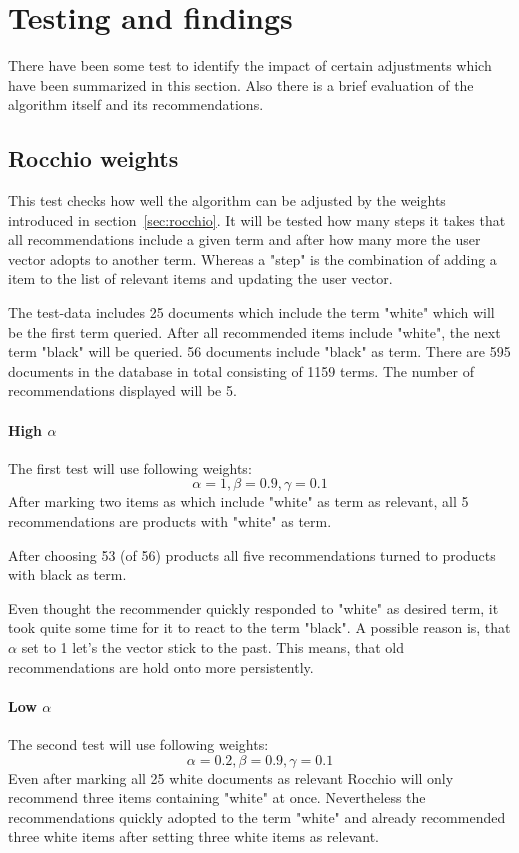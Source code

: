 
\section{Testing and findings}
\label{sec:testing-findings}
There have been some test to identify the impact of certain adjustments which have been summarized in this section.
Also there is a brief evaluation of the algorithm itself and its recommendations.


\subsection{Rocchio weights}
\label{sec:rocchio-weights}
This test checks how well the algorithm can be adjusted by the weights introduced in section~\ref{sec:rocchio}.
It will be tested how many steps it takes that all recommendations include a given term and after how many more the user vector adopts to another term.
Whereas a "step" is the combination of adding a item to the list of relevant items and updating the user vector.

The test-data includes 25 documents which include the term "white" which will be the first term queried.
After all recommended items include "white", the next term "black" will be queried.
56 documents include "black" as term.
There are 595 documents in the database in total consisting of 1159 terms.
The number of recommendations displayed will be 5.
\\

\paragraph{High $\alpha$}
The first test will use following weights:
$$\alpha = 1, \beta = 0.9, \gamma = 0.1$$
After marking two items as which include "white" as term as relevant, all 5 recommendations are products with "white" as term.

After choosing 53 (of 56) products all five recommendations turned to products with black as term.

Even thought the recommender quickly responded to "white" as desired term, it took quite some time for it to react to the term "black".
A possible reason is, that $\alpha$ set to 1 let's the vector stick to the past.
This means, that old recommendations are hold onto more persistently.
\\

\paragraph{Low $\alpha$}
The second test will use following weights:
$$\alpha = 0.2, \beta = 0.9, \gamma = 0.1$$
Even after marking all 25 white documents as relevant Rocchio will only recommend three items containing "white" at once.
Nevertheless the recommendations quickly adopted to the term "white" and already recommended three white items after setting three white items as relevant.

